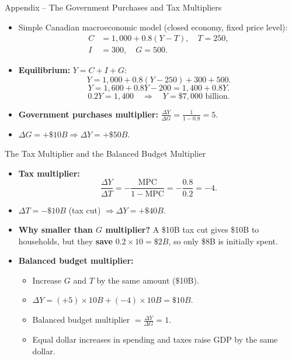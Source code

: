 \documentclass[aspectratio=169]{beamer}
\begin{document}
\begin{frame}{Appendix -- The Government Purchases and Tax Multipliers}
\transfade
\begin{itemize}[<+->]
  \item Simple Canadian macroeconomic model (closed economy, fixed price level):
  \begin{align*}
    C &= 1{,}000 + 0.8(Y - T), \quad T = 250, \\
    I &= 300, \quad G = 500.
  \end{align*}
  \item \textbf{Equilibrium:} $Y = C + I + G$:
  \[
    Y = 1{,}000 + 0.8(Y - 250) + 300 + 500.
  \]
  \[
    Y = 1{,}600 + 0.8Y - 200 = 1{,}400 + 0.8Y.
  \]
  \[
    0.2Y = 1{,}400 \quad \Rightarrow \quad Y = \$7{,}000\text{ billion}.
  \]
  \item \textbf{Government purchases multiplier:} $\frac{\Delta Y}{\Delta G} = \frac{1}{1 - 0.8} = 5$.
  \item $\Delta G = +\$10B \Rightarrow \Delta Y = +\$50B$.
\end{itemize}
\end{frame}

\begin{frame}{The Tax Multiplier and the Balanced Budget Multiplier}
\transfade
\begin{itemize}[<+->]
  \item \textbf{Tax multiplier:}
  \[
    \frac{\Delta Y}{\Delta T} = -\frac{\text{MPC}}{1 - \text{MPC}} = -\frac{0.8}{0.2} = -4.
  \]
  \item $\Delta T = -\$10B$ (tax cut) $\Rightarrow \Delta Y = +\$40B$.
  \item \textbf{Why smaller than $G$ multiplier?} A \$10B tax cut gives \$10B to households, but they \textbf{save} $0.2 \times 10 = \$2B$, so only \$8B is initially spent.
  \item \textbf{Balanced budget multiplier:}
  \begin{itemize}[<+->]
    \item Increase $G$ and $T$ by the same amount (\$10B).
    \item $\Delta Y = (+5) \times 10B + (-4) \times 10B = \$10B$.
    \item Balanced budget multiplier $= \frac{\Delta Y}{\Delta G} = 1$.
    \item Equal dollar increases in spending and taxes raise GDP by the same dollar.
  \end{itemize}
\end{itemize}
\end{frame}
\end{document}
